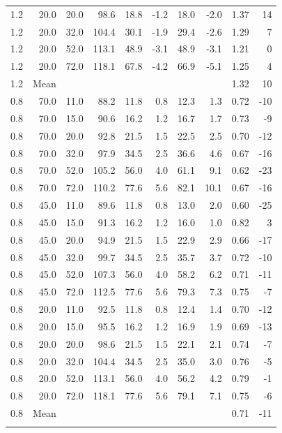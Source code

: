 \begin{table}
\begin{tabular}{rrrrrrrrrr}
1.2 & 20.0 & 20.0 & 98.6 & 18.8 & -1.2 & 18.0 & -2.0 & 1.37 & 14 \\
1.2 & 20.0 & 32.0 & 104.4 & 30.1 & -1.9 & 29.4 & -2.6 & 1.29 & 7 \\
1.2 & 20.0 & 52.0 & 113.1 & 48.9 & -3.1 & 48.9 & -3.1 & 1.21 & 0 \\
1.2 & 20.0 & 72.0 & 118.1 & 67.8 & -4.2 & 66.9 & -5.1 & 1.25 & 4 \\
1.2 & Mean & & & & & & & 1.32 & 10 \\
0.8 & 70.0 & 11.0 & 88.2 & 11.8 & 0.8 & 12.3 & 1.3 & 0.72 & -10 \\
0.8 & 70.0 & 15.0 & 90.6 & 16.2 & 1.2 & 16.7 & 1.7 & 0.73 & -9 \\
0.8 & 70.0 & 20.0 & 92.8 & 21.5 & 1.5 & 22.5 & 2.5 & 0.70 & -12 \\
0.8 & 70.0 & 32.0 & 97.9 & 34.5 & 2.5 & 36.6 & 4.6 & 0.67 & -16 \\
0.8 & 70.0 & 52.0 & 105.2 & 56.0 & 4.0 & 61.1 & 9.1 & 0.62 & -23 \\
0.8 & 70.0 & 72.0 & 110.2 & 77.6 & 5.6 & 82.1 & 10.1 & 0.67 & -16 \\
0.8 & 45.0 & 11.0 & 89.6 & 11.8 & 0.8 & 13.0 & 2.0 & 0.60 & -25 \\
0.8 & 45.0 & 15.0 & 91.3 & 16.2 & 1.2 & 16.0 & 1.0 & 0.82 & 3 \\
0.8 & 45.0 & 20.0 & 94.9 & 21.5 & 1.5 & 22.9 & 2.9 & 0.66 & -17 \\
0.8 & 45.0 & 32.0 & 99.7 & 34.5 & 2.5 & 35.7 & 3.7 & 0.72 & -10 \\
0.8 & 45.0 & 52.0 & 107.3 & 56.0 & 4.0 & 58.2 & 6.2 & 0.71 & -11 \\
0.8 & 45.0 & 72.0 & 112.5 & 77.6 & 5.6 & 79.3 & 7.3 & 0.75 & -7 \\
0.8 & 20.0 & 11.0 & 92.5 & 11.8 & 0.8 & 12.4 & 1.4 & 0.70 & -12 \\
0.8 & 20.0 & 15.0 & 95.5 & 16.2 & 1.2 & 16.9 & 1.9 & 0.69 & -13 \\
0.8 & 20.0 & 20.0 & 98.6 & 21.5 & 1.5 & 22.1 & 2.1 & 0.74 & -7 \\
0.8 & 20.0 & 32.0 & 104.4 & 34.5 & 2.5 & 35.0 & 3.0 & 0.76 & -5 \\
0.8 & 20.0 & 52.0 & 113.1 & 56.0 & 4.0 & 56.2 & 4.2 & 0.79 & -1 \\
0.8 & 20.0 & 72.0 & 118.1 & 77.6 & 5.6 & 79.1 & 7.1 & 0.75 & -6 \\
0.8 & Mean & & & & & & & 0.71 & -11 \\
\bottomhline
\end{tabular}
\end{table}
